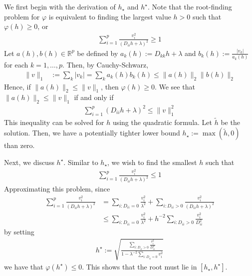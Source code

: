 \documentclass[fontsize=11pt]{article}
\newcommand{\R}{\mathbb{R}}
\newcommand{\norm}[1]{\|#1\|}
\newcommand{\abs}[1]{\left|#1\right|}
\begin{document}
We first begin with the derivation of $h_\star$ and $h^\star$.
Note that the root-finding problem for $\varphi$
is equivalent to finding the largest value $h > 0$ such that $\varphi(h) \geq 0$, or
\begin{align*}
    \sum\limits_{i=1}^p
    \frac{v_i^2}{(D_{ii} h + \lambda)^2}
    \geq
    1
\end{align*}
Let $a(h), b(h) \in \R^p$ be defined by $a_k(h) := D_{kk} h + \lambda$
and $b_k(h) := \frac{\abs{v_k}}{a_k(h)}$ for each $k=1,\ldots, p$.
Then, by Cauchy-Schwarz,
\begin{align*}
    \norm{v}_1
    &:=
    \sum\limits_{k} \abs{v_k}
    =
    \sum\limits_{k} a_k(h) b_k(h)
    \leq
    \norm{a(h)}_{2} \norm{b(h)}_2
\end{align*}
Hence, if $\norm{a(h)}_2 \leq \norm{v}_1$,
then $\varphi(h) \geq 0$.
We see that $\norm{a(h)}_2 \leq \norm{v}_1$ if and only if
\begin{align*}
    \sum\limits_{i=1}^p
    (D_{ii} h + \lambda)^2
    \leq
    \norm{v}_1^2
\end{align*}
This inequality can be solved for $h$ using the quadratic formula.
Let $\tilde{h}$ be the solution.
Then, we have a potentially tighter lower bound $h_\star := \max(\tilde{h}, 0)$ than zero.

Next, we discuss $h^\star$.
Similar to $h_\star$, we wish to find the smallest $h$ such that
\begin{align*}
    \sum\limits_{i=1}^p
    \frac{v_i^2}{(D_{ii} h + \lambda)^2}
    \leq
    1
\end{align*}
Approximating this problem, since
\begin{align}
    \sum\limits_{i=1}^p
    \frac{v_i^2}{(D_{ii} h + \lambda)^2}
    &=
    \sum\limits_{i: D_{ii} = 0}
    \frac{v_i^2}{\lambda^2}
    +
    \sum\limits_{i: D_{ii} > 0}
    \frac{v_i^2}{(D_{ii} h + \lambda)^2}
    \\&\leq 
    \sum\limits_{i: D_{ii} = 0}
    \frac{v_i^2}{\lambda^2}
    +
    h^{-2}
    \sum\limits_{i: D_{ii} > 0}
    \frac{v_i^2}{D_{ii}^2 }
    \label{eq:nmab:upper-approx}
\end{align}
by setting 
\begin{align*}
    h^\star
    := 
    \sqrt{
        \frac{
            \sum\limits_{i: D_{ii} > 0} \frac{v_i^2}{D_{ii}^2}
        }{
            1 - \lambda^{-2} \sum\limits_{i : D_{ii} = 0} v_i^2
        }
    }
\end{align*}
we have that $\varphi(h^\star) \leq 0$.
This shows that the root must lie in $[h_\star, h^\star]$.
\end{document}
